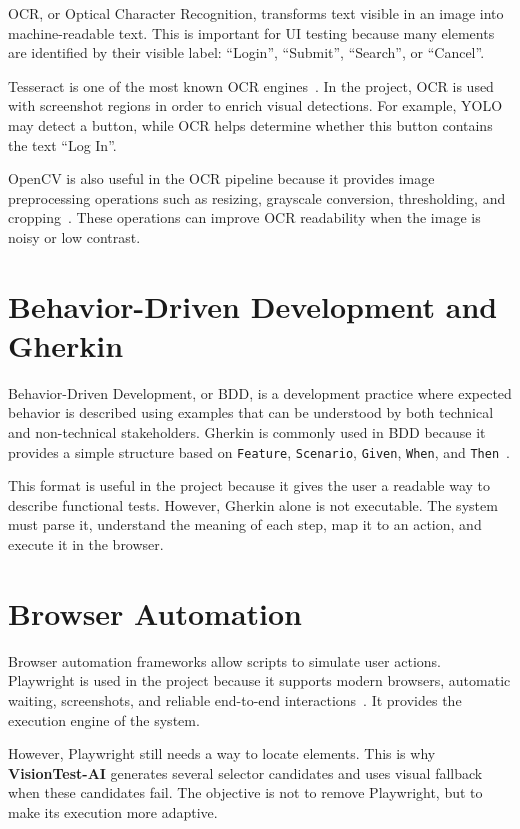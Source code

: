 OCR, or Optical Character Recognition, transforms text visible in an image into machine-readable text. This is important for UI testing because many elements are identified by their visible label: ``Login'', ``Submit'', ``Search'', or ``Cancel''.

Tesseract is one of the most known OCR engines~\cite{tesseract_paper,tesseract_docs}. In the project, OCR is used with screenshot regions in order to enrich visual detections. For example, YOLO may detect a button, while OCR helps determine whether this button contains the text ``Log In''.

OpenCV is also useful in the OCR pipeline because it provides image preprocessing operations such as resizing, grayscale conversion, thresholding, and cropping~\cite{opencv_library}. These operations can improve OCR readability when the image is noisy or low contrast.

\section{Behavior-Driven Development and Gherkin}
\label{sec:bdd_review}

Behavior-Driven Development, or BDD, is a development practice where expected behavior is described using examples that can be understood by both technical and non-technical stakeholders. Gherkin is commonly used in BDD because it provides a simple structure based on \texttt{Feature}, \texttt{Scenario}, \texttt{Given}, \texttt{When}, and \texttt{Then}~\cite{gherkin_reference,bdd_cucumber_book}.

This format is useful in the project because it gives the user a readable way to describe functional tests. However, Gherkin alone is not executable. The system must parse it, understand the meaning of each step, map it to an action, and execute it in the browser.

\section{Browser Automation}
\label{sec:browser_automation_review}

Browser automation frameworks allow scripts to simulate user actions. Playwright is used in the project because it supports modern browsers, automatic waiting, screenshots, and reliable end-to-end interactions~\cite{playwright_docs}. It provides the execution engine of the system.

However, Playwright still needs a way to locate elements. This is why \textbf{VisionTest-AI} generates several selector candidates and uses visual fallback when these candidates fail. The objective is not to remove Playwright, but to make its execution more adaptive.


